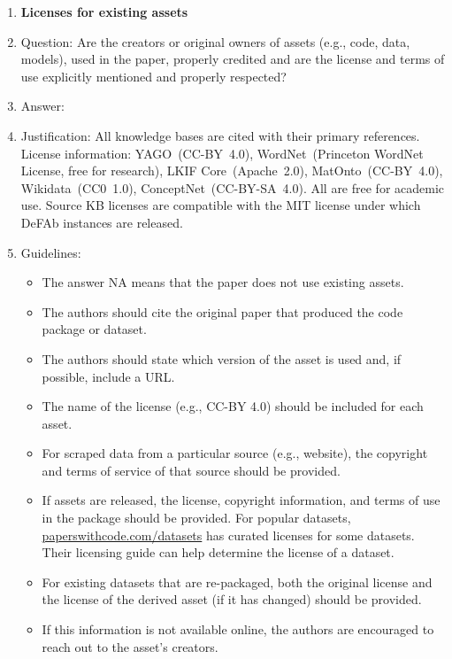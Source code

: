 \documentclass{article}
\theoremstyle{definition}
\begin{document}
\begin{enumerate}
\item {\bf Licenses for existing assets}
    \item[] Question: Are the creators or original owners of assets (e.g., code, data, models), used in the paper, properly credited and are the license and terms of use explicitly mentioned and properly respected?
    \item[] Answer: \answerYes{}
    \item[] Justification: All knowledge bases are cited with their primary references. License information: YAGO~(CC-BY~4.0), WordNet~(Princeton WordNet License, free for research), LKIF Core~(Apache~2.0), MatOnto~(CC-BY~4.0), Wikidata~(CC0~1.0), ConceptNet~(CC-BY-SA~4.0). All are free for academic use. Source KB licenses are compatible with the MIT license under which DeFAb instances are released.
    \item[] Guidelines:
    \begin{itemize}
        \item The answer NA means that the paper does not use existing assets.
        \item The authors should cite the original paper that produced the code package or dataset.
        \item The authors should state which version of the asset is used and, if possible, include a URL.
        \item The name of the license (e.g., CC-BY 4.0) should be included for each asset.
        \item For scraped data from a particular source (e.g., website), the copyright and terms of service of that source should be provided.
        \item If assets are released, the license, copyright information, and terms of use in the package should be provided. For popular datasets, \url{paperswithcode.com/datasets} has curated licenses for some datasets. Their licensing guide can help determine the license of a dataset.
        \item For existing datasets that are re-packaged, both the original license and the license of the derived asset (if it has changed) should be provided.
        \item If this information is not available online, the authors are encouraged to reach out to the asset's creators.
    \end{itemize}


\end{enumerate}
\end{document}

